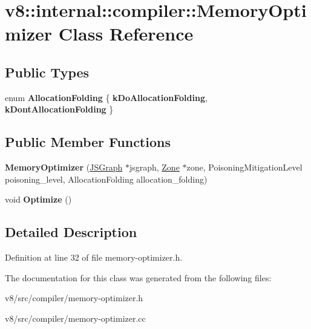 \hypertarget{classv8_1_1internal_1_1compiler_1_1MemoryOptimizer}{}\section{v8\+:\+:internal\+:\+:compiler\+:\+:Memory\+Optimizer Class Reference}
\label{classv8_1_1internal_1_1compiler_1_1MemoryOptimizer}
\subsection*{Public Types}
\begin{DoxyCompactItemize}
\item 
\mbox{\label{classv8_1_1internal_1_1compiler_1_1MemoryOptimizer_a64a290800cb726c93a80157660edd727}} 
enum {\bfseries Allocation\+Folding} \{ {\bfseries k\+Do\+Allocation\+Folding}, 
{\bfseries k\+Dont\+Allocation\+Folding}
 \}
\end{DoxyCompactItemize}
\subsection*{Public Member Functions}
\begin{DoxyCompactItemize}
\item 
\mbox{\label{classv8_1_1internal_1_1compiler_1_1MemoryOptimizer_a21c847a9e03e995a303d0a467e97820d}} 
{\bfseries Memory\+Optimizer} (\mbox{\hyperlink{classv8_1_1internal_1_1compiler_1_1JSGraph}{J\+S\+Graph}} $\ast$jsgraph, \mbox{\hyperlink{classv8_1_1internal_1_1Zone}{Zone}} $\ast$zone, Poisoning\+Mitigation\+Level poisoning\+\_\+level, Allocation\+Folding allocation\+\_\+folding)
\item 
\mbox{\label{classv8_1_1internal_1_1compiler_1_1MemoryOptimizer_a8ef1148e82af3bdce225833270367510}} 
void {\bfseries Optimize} ()
\end{DoxyCompactItemize}


\subsection{Detailed Description}


Definition at line 32 of file memory-\/optimizer.\+h.



The documentation for this class was generated from the following files\+:\begin{DoxyCompactItemize}
\item 
v8/src/compiler/memory-\/optimizer.\+h\item 
v8/src/compiler/memory-\/optimizer.\+cc\end{DoxyCompactItemize}
